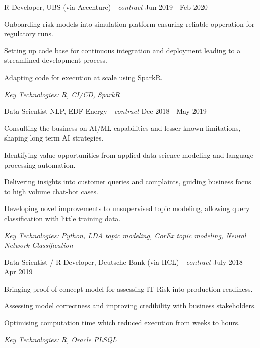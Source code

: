 \documentclass[11pt,article,oneside]{memoir}
\newenvironment{itemize*}{%
  \renewcommand\labelitemi{\textbullet}
  \footnotesize
  \begin{itemize}%
    \setlength{\itemsep}{0pt}}%
  {\end{itemize}
}
\begin{document}
\normalsize
\medskip
\ind R Developer, UBS (via Accenture) - \emph{contract} \hfill Jun 2019 - Feb 2020
\begin{itemize*}
    \item Onboarding risk models into simulation platform ensuring reliable opperation for regulatory runs.
    \item Setting up code base for continuous integration and deployment leading to a streamlined development process.
    \item Adapting code for execution at scale using SparkR.
\end{itemize*}
\ind \hspace{0.35in} \footnotesize \emph{Key Technologies: R, CI/CD, SparkR}

\normalsize
\medskip
\ind Data Scientist NLP, EDF Energy - \emph{contract} \hfill Dec 2018 - May 2019
\begin{itemize*}
    \item Consulting the business on AI/ML capabilities and lesser known limitations, shaping long term AI strategies.
    \item Identifying value opportunities from applied data science modeling and language processing automation.
    \item Delivering insights into customer queries and complaints, guiding business focus to high volume chat-bot cases.
    \item Developing novel improvements to unsupervised topic modeling, allowing query classification with little training data.
\end{itemize*}
\ind \hspace{0.35in} \footnotesize \emph{Key Technologies: Python, LDA topic modeling, CorEx topic modeling, Neural Network Classification }

\normalsize
\medskip
\ind Data Scientist / R Developer, Deutsche Bank (via HCL) - \emph{contract} \hfill July 2018 - Apr 2019
\begin{itemize*}
    \item Bringing proof of concept model for assessing IT Risk into production readiness.
    \item Assessing model correctness and improving credibility with business stakeholders. 
    \item Optimising computation time which reduced execution from weeks to hours.
\end{itemize*}
\ind \hspace{0.35in} \footnotesize \emph{Key Technologies: R, Oracle PLSQL}
\end{document}
